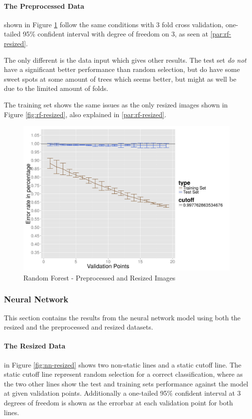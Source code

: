 \paragraph{The Preprocessed Data}
shown in Figure \ref{fig:rf-preprocessed} follow the same conditions with 3 fold cross validation, one-tailed 95\% confident interval with degree of freedom on 3, as seen at \ref{par:rf-resized}.

The only different is the data input which gives other results.
The test set \emph{do not} have a significant better performance than random selection, but do have some sweet spots at some amount of trees which seems better, but might as well be due to the limited amount of folds.

The training set shows the same issues as the only resized images shown in Figure \ref{fig:rf-resized}, also explained in \ref{par:rf-resized}.

\begin{figure}
  \centering
  \includegraphics[width=0.9\linewidth]{Images/DRFpreprocessed}
  \caption{Random Forest - Preprocessed and Resized Images}
  \label{fig:rf-preprocessed}
\end{figure}

\subsubsection{Neural Network}
\label{subsubsec:neuralnetwork}
This section contains the results from the neural network model using both the resized and the preprocessed and resized datasets.

\paragraph{The Resized Data}
in Figure \ref{fig:nn-resized} shows two non-static lines and a static cutoff line.
The static cutoff line represent random selection for a correct classification, where as the two other lines show the test and training sets performance against the model at given validation points. Additionally a one-tailed 95\% confident interval at 3 degrees of freedom is shown as the errorbar at each validation point for both lines.

